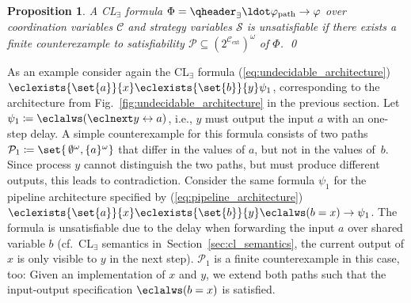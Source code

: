\documentclass{LMCS}
\theoremstyle{plain}\newtheorem{theorem}[thm]{Theorem}
\theoremstyle{plain}\newtheorem{lemma}[thm]{Lemma}
\theoremstyle{plain}\newtheorem{proposition}[thm]{Proposition}
\theoremstyle{plain}\newtheorem{corollary}[thm]{Corollary}
\theoremstyle{definition}\newtheorem{definition}{Definition}[section]
\begin{document}
\begin{proposition} \label{eq:dr_without_faults_finite_unsatisfiability}
  A CL$_\exists$ formula $\Phi = \qheader_\exists \ldot \varphi_{\text{path}} \rightarrow \varphi$ over coordination variables $\mathcal{C}$ and strategy variables $\mathcal{S}$ is unsatisfiable if there exists a finite counterexample to satisfiability $\mathcal{P} \subseteq (2^{\mathcal{C}_\text{ext}})^\omega$ of $\Phi$. \qed
\end{proposition}\noindent
As an example consider again the CL$_\exists$ formula (\ref{eq:undecidable_architecture}) $\eclexists{\set{a}}{x} \eclexists{\set{b}}{y} \psi_1$,
corresponding to the architecture from Fig.~\ref{fig:undecidable_architecture} in the previous section. Let $\psi_1 \coloneqq \eclalws (\eclnext y \leftrightarrow a)$, i.e., $y$ must output the input $a$ with an one-step delay.
A simple counterexample for this formula consists of two paths $\mathcal{P}_1 \coloneqq \set{\, \emptyset^\omega, \{a\}^\omega}$ that differ in the values of $a$, but not in the values of~$b$. 
Since process $y$ cannot distinguish the two paths, but must produce different outputs, this leads to contradiction.
Consider the same formula $\psi_1$ for the pipeline architecture specified by (\ref{eq:pipeline_architecture}) $\eclexists{\set{a}}{x} \eclexists{\set{b}}{y} \eclalws (b = x) \rightarrow \psi_1$.
The formula is unsatisfiable due to the delay when forwarding the input $a$ over shared variable $b$ (cf.\ CL$_\exists$ semantics in~Section~\ref{sec:cl_semantics}, the current output of $x$ is only visible to $y$ in the next step).
$\mathcal{P}_1$ is a finite counterexample in this case, too: Given an implementation of $x$ and $y$, we extend both paths such that the input-output specification $\eclalws (b = x)$ is satisfied.
\end{document}
